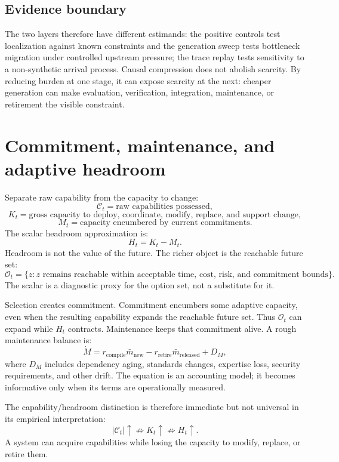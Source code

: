\documentclass[11pt]{article}
\newcommand{\Cset}{\mathcal{C}}
\newcommand{\Oset}{\mathcal{O}}
\begin{document}
\subsection{Evidence boundary}

The two layers therefore have different estimands: the positive controls test localization against known constraints and the generation sweep tests bottleneck migration under controlled upstream pressure; the trace replay tests sensitivity to a non-synthetic arrival process. Causal compression does not abolish scarcity. By reducing burden at one stage, it can expose scarcity at the next: cheaper generation can make evaluation, verification, integration, maintenance, or retirement the visible constraint.

\section{Commitment, maintenance, and adaptive headroom}

Separate raw capability from the capacity to change:
\[
\Cset_t=\text{raw capabilities possessed},
\]
\[
K_t=\text{gross capacity to deploy, coordinate, modify, replace, and support change},
\]
\[
M_t=\text{capacity encumbered by current commitments}.
\]
The scalar headroom approximation is:
\[
H_t=K_t-M_t.
\]
Headroom is not the value of the future. The richer object is the reachable future set:
\[
\Oset_t=\{z:z\text{ remains reachable within acceptable time, cost, risk, and commitment bounds}\}.
\]
The scalar is a diagnostic proxy for the option set, not a substitute for it.

Selection creates commitment. Commitment encumbers some adaptive capacity, even when the resulting capability expands the reachable future set. Thus \(\Oset_t\) can expand while \(H_t\) contracts. Maintenance keeps that commitment alive. A rough maintenance balance is:
\[
\dot M
=r_{\mathrm{compile}}\bar m_{\mathrm{new}}
-r_{\mathrm{retire}}\bar m_{\mathrm{released}}
+D_M,
\]
where \(D_M\) includes dependency aging, standards changes, expertise loss, security requirements, and other drift. The equation is an accounting model; it becomes informative only when its terms are operationally measured.

The capability/headroom distinction is therefore immediate but not universal in its empirical interpretation:
\[
|\Cset_t|\uparrow
\not\Rightarrow K_t\uparrow
\not\Rightarrow H_t\uparrow.
\]
A system can acquire capabilities while losing the capacity to modify, replace, or retire them.
\end{document}
